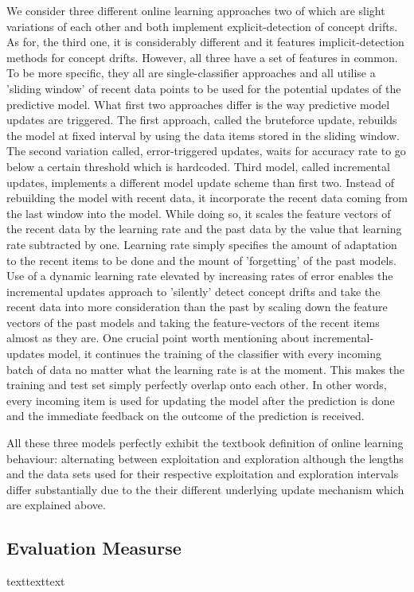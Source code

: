 \documentclass[12pt]{article}
\begin{document}
We consider three different online learning approaches two of which are slight variations of each other and both implement explicit-detection of concept drifts. As for, the third one, it is considerably different and it features implicit-detection methods for concept drifts. However, all three have a set of  features in common. To be more specific, they all are single-classifier approaches and all utilise a 'sliding window' of recent data points to be used for the potential updates of the predictive model. What first two approaches differ is the way predictive model updates are triggered. The first approach, called the bruteforce update, rebuilds the model at fixed interval by using the data items stored in the sliding window. The second variation called, error-triggered updates, waits for accuracy rate to go below a certain threshold which is hardcoded. Third model, called incremental updates, implements a different model update scheme than first two. Instead of rebuilding the model with recent data, it incorporate the recent data coming from the last window into the model. While doing so, it scales the feature vectors of the recent data by the learning rate and the past data by the value that learning rate subtracted by one. Learning rate simply specifies the amount of adaptation to the recent items to be done and the mount of 'forgetting' of the past models. Use of a dynamic learning rate elevated by increasing rates of error enables the incremental updates approach to 'silently' detect concept drifts and take the recent data into more consideration than the past by scaling down the feature vectors of the past models and taking the feature-vectors of the recent items almost as they are. One crucial point worth mentioning about incremental-updates model, it continues the training of the classifier with every incoming batch of data no matter what the learning rate is at the moment. This makes the training and test set simply perfectly overlap onto each other. In other words, every incoming item is used for updating the model after the prediction is done and the immediate feedback on the outcome of the prediction is received. 

All these three models perfectly exhibit the textbook definition of online learning behaviour: alternating between exploitation and exploration although the lengths and the data sets used for their respective exploitation and exploration intervals differ substantially due to the their different underlying update mechanism which are explained above.


\subsection{Evaluation Measurse}
texttexttext
\end{document}
